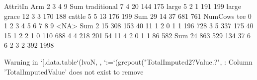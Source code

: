 \begin{Schunk}
\begin{Soutput}
             AttritIn
Arm             2   3   4   9 Sum
  traditional   7   4  20 144 175
  large         5   2   1 191 199
  large grace  12   3   3 170 188
  cattle        5   5  13 176 199
  Sum          29  14  37 681 761
     NumCows
tee      0    1    2    3    4    5    6    7    8    9 <NA>  Sum
  2     15  308  153   40   11    1    2    0    1    1  196  728
  3      5  337  175   40   15    1    2    2    1    0  110  688
  4      4  218  201   54   11    4    2    0    1    1   86  582
  Sum   24  863  529  134   37    6    6    2    3    2  392 1998
\end{Soutput}
\end{Schunk}
\begin{Schunk}
\begin{Soutput}
Warning in `[.data.table`(lvoN, , `:=`(grepout("TotalImputed2?Value.?", : Column 'TotalImputedValue' does not exist to remove
\end{Soutput}
\end{Schunk}
